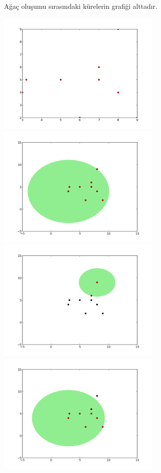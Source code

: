 \documentclass[12pt,fleqn]{article}\usepackage{../../common}
\begin{document}
Ağaç oluşumu sırasındaki kürelerin grafiği alttadır. 

\includegraphics[height=6cm]{knn0.png}
\includegraphics[height=6cm]{knn1.png}
\includegraphics[height=6cm]{knn2.png}
\includegraphics[height=6cm]{knn3.png}
\end{document}
